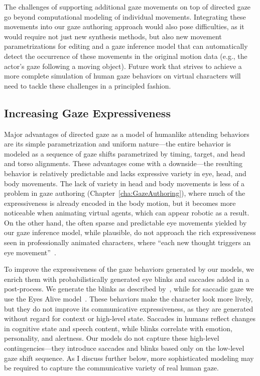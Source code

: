 The challenges of supporting additional gaze movements on top of directed gaze go beyond computational modeling of individual movements. Integrating these movements into our gaze authoring approach would also pose difficulties, as it would require not just new synthesis methods, but also new movement parametrizations for editing and a gaze inference model that can automatically detect the occurrence of these movements in the original motion data (e.g., the actor's gaze following a moving object). Future work that strives to achieve a more complete simulation of human gaze behaviors on virtual characters will need to tackle these challenges in a principled fashion.

\subsection{Increasing Gaze Expressiveness}

Major advantages of directed gaze as a model of humanlike attending behaviors are its simple parametrization and uniform nature---the entire behavior is modeled as a sequence of gaze shifts parametrized by timing, target, and head and torso alignments. These advantages come with a downside---the resulting behavior is relatively predictable and lacks expressive variety in eye, head, and body movements. The lack of variety in head and body movements is less of a problem in gaze authoring (Chapter~\ref{cha:GazeAuthoring}), where much of the expressiveness is already encoded in the body motion, but it becomes more noticeable when animating virtual agents, which can appear robotic as a result.
On the other hand, the often sparse and predictable eye movements yielded by our gaze inference model, while plausible, do not approach the rich expressiveness seen in professionally animated characters, where ``each new thought triggers an eye movement''~\citep{maestri2001digital}.

To improve the expressiveness of the gaze behaviors generated by our models, we enrich them with probabilistically generated eye blinks and saccades added in a post-process. We generate the blinks as described by~\citet{peters2010animating}, while for saccadic gaze we use the Eyes Alive model~\citep{lee2002eyes}. These behaviors make the character look more lively, but they do not improve its communicative expressiveness, as they are generated without regard for context or high-level state. Saccades in humans reflect changes in cognitive state and speech content, while blinks correlate with emotion, personality, and alertness. Our models do not capture these high-level contingencies---they introduce saccades and blinks based only on the low-level gaze shift sequence. As I discuss further below, more sophisticated modeling may be required to capture the communicative variety of real human gaze.

